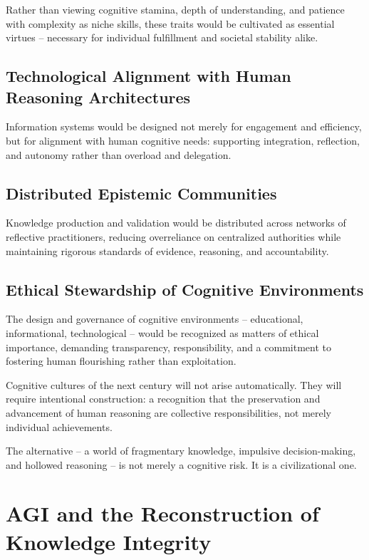 Rather than viewing cognitive stamina, depth of understanding, and
patience with complexity as niche skills, these traits would be
cultivated as essential virtues -- necessary for individual fulfillment
and societal stability alike.

\subsection{Technological Alignment with Human Reasoning Architectures}

Information systems would be designed not merely for engagement and
efficiency, but for alignment with human cognitive needs: supporting
integration, reflection, and autonomy rather than overload and
delegation.

\subsection{Distributed Epistemic Communities}

Knowledge production and validation would be distributed across networks
of reflective practitioners, reducing overreliance on centralized
authorities while maintaining rigorous standards of evidence, reasoning,
and accountability.

\subsection{Ethical Stewardship of Cognitive Environments}

The design and governance of cognitive environments -- educational,
informational, technological -- would be recognized as matters of ethical
importance, demanding transparency, responsibility, and a commitment to
fostering human flourishing rather than exploitation.

Cognitive cultures of the next century will not arise automatically.
They will require intentional construction: a recognition that the
preservation and advancement of human reasoning are collective
responsibilities, not merely individual achievements.

The alternative -- a world of fragmentary knowledge, impulsive
decision-making, and hollowed reasoning -- is not merely a cognitive
risk. It is a civilizational one.



\section{AGI and the Reconstruction of Knowledge Integrity}

